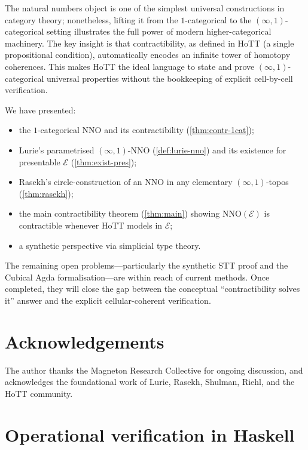 \documentclass[12pt]{article}
\theoremstyle{definition}
\theoremstyle{remark}
\begin{document}
The natural numbers object is one of the simplest universal constructions in category theory; nonetheless, lifting it from the $1$-categorical to the $(\infty,1)$-categorical setting illustrates the full power of modern higher-categorical machinery. The key insight is that contractibility, as defined in HoTT (a single propositional condition), automatically encodes an infinite tower of homotopy coherences. This makes HoTT the ideal language to state and prove $(\infty,1)$-categorical universal properties without the bookkeeping of explicit cell-by-cell verification.

We have presented:
\begin{itemize}
  \item the $1$-categorical NNO and its contractibility (\cref{thm:contr-1cat});
  \item Lurie's parametrised $(\infty,1)$-NNO (\cref{def:lurie-nno}) and its existence for presentable $\mathcal{E}$ (\cref{thm:exist-pres});
  \item Rasekh's circle-construction of an NNO in any elementary $(\infty,1)$-topos (\cref{thm:rasekh});
  \item the main contractibility theorem (\cref{thm:main}) showing $\mathrm{NNO}(\mathcal{E})$ is contractible whenever HoTT models in $\mathcal{E}$;
  \item a synthetic perspective via simplicial type theory.
\end{itemize}

The remaining open problems---particularly the synthetic STT proof and the Cubical Agda formalisation---are within reach of current methods. Once completed, they will close the gap between the conceptual ``contractibility solves it'' answer and the explicit cellular-coherent verification.

\section*{Acknowledgements}

The author thanks the Magneton Research Collective for ongoing discussion, and acknowledges the foundational work of Lurie, Rasekh, Shulman, Riehl, and the HoTT community.

\appendix

\section{Operational verification in Haskell}\label{app:haskell}
\end{document}
